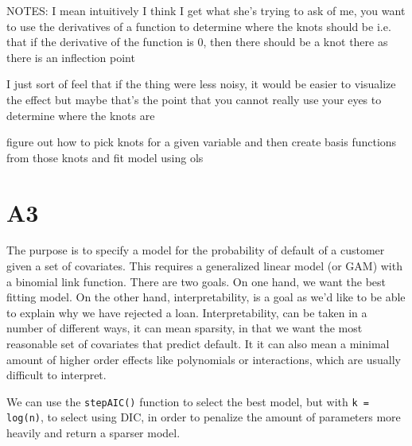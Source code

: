 NOTES:
I mean intuitively I think I get what she's trying to ask of me, you want to use the derivatives of a function to determine where the knots should be
i.e. that if the derivative of the function is 0, then there should be a knot there as there is an inflection point

I just sort of feel that if the thing were less noisy, it would be easier to visualize the effect
but maybe that's the point
that you cannot really use your eyes to determine where the knots are

figure out how to pick knots for a given variable
and then create basis functions from those knots
and fit model using ols


\section{A3}


The purpose is to specify a model for the probability of default of a customer given a set of covariates. This requires a generalized linear model (or GAM) with a binomial link function. There are two goals. On one hand, we want the best fitting model. On the other hand, interpretability, is a goal as we'd like to be able to explain why we have rejected a loan. Interpretability, can be taken in a number of different ways, it can mean sparsity, in that we want the most reasonable set of covariates that predict default. It it can also mean a minimal amount of higher order effects like polynomials or interactions, which are usually difficult to interpret. 

We can use the \lstinline{stepAIC()} function to select the best model, but with \lstinline{k = log(n)}, to select using DIC, in order to penalize the amount of parameters more heavily and return a sparser model.

